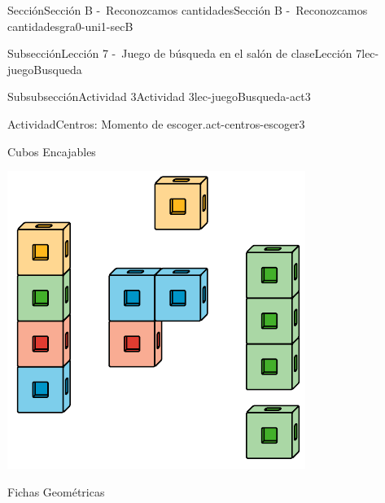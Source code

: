 \documentclass[twoside,10pt,]{article}
\begin{document}
\begin{sectionptx}{Sección}{Sección B -~Reconozcamos cantidades}{}{Sección B -~Reconozcamos cantidades}{}{}{gra0-uni1-secB}
\begin{subsectionptx}{Subsección}{Lección 7 -~Juego de búsqueda en el salón de clase}{}{Lección 7}{}{}{lec-juegoBusqueda}
\begin{subsubsectionptx}{Subsubsección}{Actividad 3}{}{Actividad 3}{}{}{lec-juegoBusqueda-act3}
\begin{activity}{Actividad}{Centros: Momento de escoger.}{act-centros-escoger3}
\begin{sidebyside}{2}{0.025}{0.025}{0.05}
\begin{sbspanel}{0.45}%
Cubos Encajables%
\par
\includegraphics[width=\linewidth]{external/svg-source/tikz-file-128850.pdf}
\end{sbspanel}%
\begin{sbspanel}{0.45}%
Fichas Geométricas%
\par

\end{sbspanel}
\end{sidebyside}
\end{activity}
\end{subsubsectionptx}
\end{subsectionptx}
\end{sectionptx}
\end{document}
